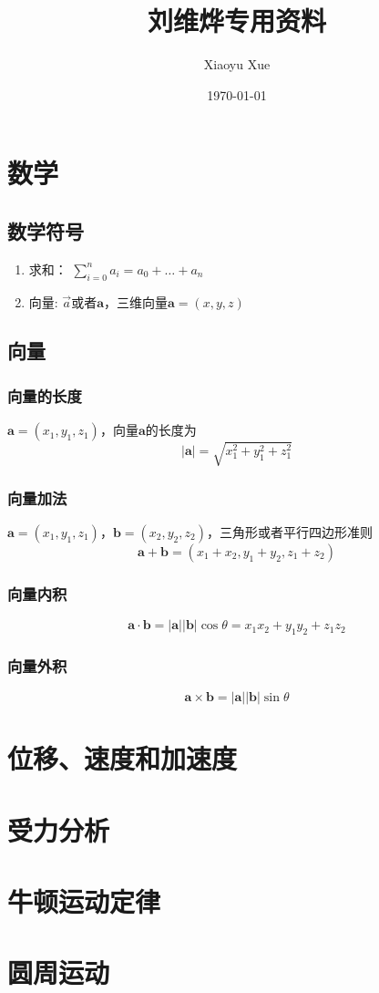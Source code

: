 \documentclass[a4paper,oneside,12pt]{article}
\title{刘维烨专用资料}
\author{Xiaoyu Xue}
\date{\today}
\newcommand{\bol}[1]{\textbf{#1}}
\begin{document}
\maketitle
\section{数学}
\subsection{数学符号}
\begin{enumerate}
	\item 求和： $\displaystyle \sum_{i = 0} ^ n a_i = a_0 + \ldots + a_n$
	\item 向量: $\vec{a}$或者$\bol{a}$，三维向量$\bol{a} = (x,y,z)$
\end{enumerate}
\subsection{向量}
\subsubsection{向量的长度}
$\bol{a} = (x_1, y_1, z_1)$，向量$\bol{a}$的长度为
\begin{displaymath}
\vert \bol{a} \vert = \sqrt{x_1^2 + y_1^2 + z_1^2}
\end{displaymath}
\subsubsection{向量加法}
$\bol{a} = (x_1, y_1, z_1)$，$\bol{b} = (x_2, y_2, z_2)$，三角形或者平行四边形准则
\begin{displaymath}
\bol{a} + \bol{b} = (x_1 + x_2, y_1 + y_2, z_1 + z_2)
\end{displaymath}
\subsubsection{向量内积}
\begin{displaymath}
\bol{a} \cdot \bol{b} = \vert \bol{a}\vert \vert\bol{b}\vert \cos\theta =x_1x_2 + y_1y_2 + z_1z_2
\end{displaymath}
\subsubsection{向量外积}
\begin{displaymath}
\bol{a}\times\bol{b} = \vert\bol{a}\vert \vert\bol{b}\vert \sin\theta
\end{displaymath}
\section{位移、速度和加速度}
\section{受力分析}
\section{牛顿运动定律}
\section{圆周运动}
\end{document}
